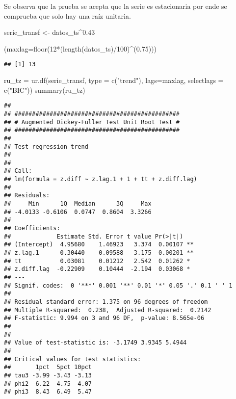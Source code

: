 \documentclass[
]{article}
\newenvironment{Shaded}{\begin{snugshade}}{\end{snugshade}}
\newcommand{\AttributeTok}[1]{\textcolor[rgb]{0.77,0.63,0.00}{#1}}
\newcommand{\DecValTok}[1]{\textcolor[rgb]{0.00,0.00,0.81}{#1}}
\newcommand{\FloatTok}[1]{\textcolor[rgb]{0.00,0.00,0.81}{#1}}
\newcommand{\FunctionTok}[1]{\textcolor[rgb]{0.00,0.00,0.00}{#1}}
\newcommand{\NormalTok}[1]{#1}
\newcommand{\OtherTok}[1]{\textcolor[rgb]{0.56,0.35,0.01}{#1}}
\newcommand{\SpecialCharTok}[1]{\textcolor[rgb]{0.00,0.00,0.00}{#1}}
\newcommand{\StringTok}[1]{\textcolor[rgb]{0.31,0.60,0.02}{#1}}
\begin{document}
Se observa que la prueba se acepta que la serie es estacionaria por ende
se comprueba que solo hay una raíz unitaria.

\begin{Shaded}
\begin{Highlighting}[]
\NormalTok{serie\_transf }\OtherTok{\textless{}{-}}\NormalTok{ datos\_ts}\SpecialCharTok{\^{}}\FloatTok{0.43}

\NormalTok{(}\AttributeTok{maxlag=}\FunctionTok{floor}\NormalTok{(}\DecValTok{12}\SpecialCharTok{*}\NormalTok{(}\FunctionTok{length}\NormalTok{(datos\_ts)}\SpecialCharTok{/}\DecValTok{100}\NormalTok{)}\SpecialCharTok{\^{}}\NormalTok{(}\FloatTok{0.75}\NormalTok{)))}
\end{Highlighting}
\end{Shaded}

\begin{verbatim}
## [1] 13
\end{verbatim}

\begin{Shaded}
\begin{Highlighting}[]
\NormalTok{ru\_tz }\OtherTok{=} \FunctionTok{ur.df}\NormalTok{(serie\_transf, }\AttributeTok{type =} \FunctionTok{c}\NormalTok{(}\StringTok{"trend"}\NormalTok{), }\AttributeTok{lags=}\NormalTok{maxlag, }\AttributeTok{selectlags =} \FunctionTok{c}\NormalTok{(}\StringTok{"BIC"}\NormalTok{))}
\FunctionTok{summary}\NormalTok{(ru\_tz)}
\end{Highlighting}
\end{Shaded}

\begin{verbatim}
## 
## ############################################### 
## # Augmented Dickey-Fuller Test Unit Root Test # 
## ############################################### 
## 
## Test regression trend 
## 
## 
## Call:
## lm(formula = z.diff ~ z.lag.1 + 1 + tt + z.diff.lag)
## 
## Residuals:
##     Min      1Q  Median      3Q     Max 
## -4.0133 -0.6106  0.0747  0.8604  3.3266 
## 
## Coefficients:
##             Estimate Std. Error t value Pr(>|t|)   
## (Intercept)  4.95680    1.46923   3.374  0.00107 **
## z.lag.1     -0.30440    0.09588  -3.175  0.00201 **
## tt           0.03081    0.01212   2.542  0.01262 * 
## z.diff.lag  -0.22909    0.10444  -2.194  0.03068 * 
## ---
## Signif. codes:  0 '***' 0.001 '**' 0.01 '*' 0.05 '.' 0.1 ' ' 1
## 
## Residual standard error: 1.375 on 96 degrees of freedom
## Multiple R-squared:  0.238,  Adjusted R-squared:  0.2142 
## F-statistic: 9.994 on 3 and 96 DF,  p-value: 8.565e-06
## 
## 
## Value of test-statistic is: -3.1749 3.9345 5.4944 
## 
## Critical values for test statistics: 
##       1pct  5pct 10pct
## tau3 -3.99 -3.43 -3.13
## phi2  6.22  4.75  4.07
## phi3  8.43  6.49  5.47
\end{verbatim}
\end{document}
